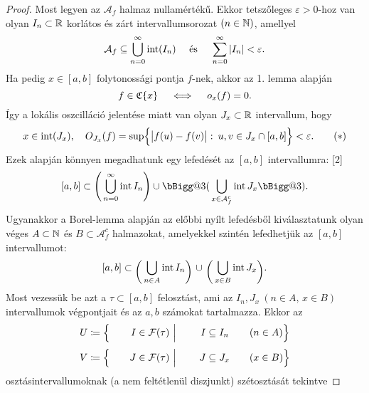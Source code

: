 \documentclass[
]{elteikthesis}[2024/04/26]
\makeatletter
\def\biggg{\bBigg@{3}}
\def\bigggl{\mathopen\biggg}
\def\bigggr{\mathclose\biggg}
\makeatother
\begin{document}
\begin{proof}
		\Backifstep
		Most legyen az \( \mathcal{A}_f \) halmaz nullamértékű. 
		Ekkor tetszőleges \( \varepsilon > 0 \)-hoz van olyan 
		\( I_n \subset \mathbb{R} \) korlátos és zárt intervallumsorozat \( (n \in \mathbb{N}) \), amellyel%
		\[
			\mathcal{A}_f \subseteq \bigcup_{n=0}^{\infty} \operatorname{int}( I_n )
			\quad \text{ és } \quad
			\sum_{n = 0}^{\infty} \abs{ I_n } < \varepsilon.
		\]
		Ha pedig \( x \in [a, b] \) folytonossági pontja \( f \)-nek, 
		akkor az 1. lemma alapján
		\[
			f \in \mathfrak{C} \{ x \} \quad \iff \quad o_x(f) = 0.
		\]
		Így a lokális oszcilláció jelentése miatt van olyan \( J_x \subset \mathbb{R} \) intervallum, hogy
		\[\label{eq:oszcilláció-felső-becslése}
			x \in \operatorname{int}(J_x), \quad
			O_{J_x} (f) = 
			\sup \Bigl\{ \abs\big{ f(u) - f(v) } \,\colon\, u, v \in J_x \cap [a, b] \Bigr\}
			< \varepsilon.
			\tag{\( * \)}
		\]
		Ezek alapján könnyen megadhatunk egy lefedését az \( [a, b] \) intervallumra:
		\marginnote{
			\[
				\mathcal{A}^c_f = [a, b] \setminus \mathcal{A}_f
			\]
		}[2\baselineskip]
		\[
			[a, b] \subset 
			\Biggl(\, \bigcup_{n=0}^{\infty} \inter I_n  \Biggr) \cup
			\bigggl(\, \bigcup_{x \in \mathcal{A}_f^c} \inter J_x \bigggr).
		\]
		Ugyanakkor a Borel-lemma alapján az előbbi nyílt lefedésből kiválasztatunk
		olyan véges \( A \subset \mathbb{N} \) és \( B \subset \mathcal{A}_f^c \) halmazokat, 
		amelyekkel szintén lefedhetjük az \( [a, b] \) intervallumot:
		\[
			[a, b] \subset 
			\mathopen{\raisebox{-0.9ex}{$ \biggl( $}}\,
			\bigcup_{n \in A} \inter I_n
			\mathopen{\raisebox{-0.9ex}{$ \biggr) $}} 
			\ \cup \
			\mathopen{\raisebox{-0.9ex}{$ \biggl( $}}\,
			\bigcup_{x \in B} \inter J_x
			\mathopen{\raisebox{-0.9ex}{$ \biggr) $}}.
		\]
		Most vezessük be azt a \( \tau \subset [a, b] \) felosztást, 
		ami az \( I_n, J_x \ (n \in A,\, x \in B) \) intervallumok végpontjait 
		és az \( a, b \) számokat tartalmazza. Ekkor az
		\begin{alignat*}{6}
			U &\coloneq \Bigl\{ 
				&& & I &\in \mathcal{F}(\tau) \ \Big\vert \ && & I &\subseteq I_n &&\quad (n \in A) 
			\Bigr\} \\[3pt]
			V &\coloneq 
			\Bigl\{ 
				&& & J &\in \mathcal{F}(\tau) \ \Big\vert \ && & J &\subseteq J_x &&\quad (x \in B) 
			\Bigr\}
		\end{alignat*}
		osztásintervallumoknak (a nem feltétlenül diszjunkt) szétosztását tekintve

\end{proof}
\end{document}
